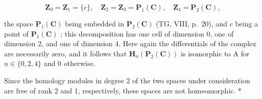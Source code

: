 \[
\mathbf {Z} _ {0} = \mathbf {Z} _ {1} = \{c \}, \quad \mathbf {Z} _ {2} = \mathbf {Z} _ {3} = \mathbf {P} _ {1} (\mathbf {C}), \quad \mathbf {Z} _ {4} = \mathbf {P} _ {2} (\mathbf {C}),
\]

the space \(\mathbf{P}_{1}(\mathbf{C})\) being embedded in \(\mathbf{P}_{2}(\mathbf{C})\) (TG, VIII, p.~20), and \(c\) being a point of \(\mathbf{P}_{1}(\mathbf{C})\) ; this decomposition has one cell of dimension 0, one of dimension 2, and one of dimension 4. Here again the differentials of the complex are necessarily zero, and it follows that \(\mathbf{H}_{n}(\mathbf{P}_{2}(\mathbf{C}))\) is isomorphic to A for \(n \in \{0, 2, 4\}\) and 0 otherwise.

Since the homology modules in degree 2 of the two spaces under consideration are free of rank 2 and 1, respectively, these spaces are not homeomorphic. *

